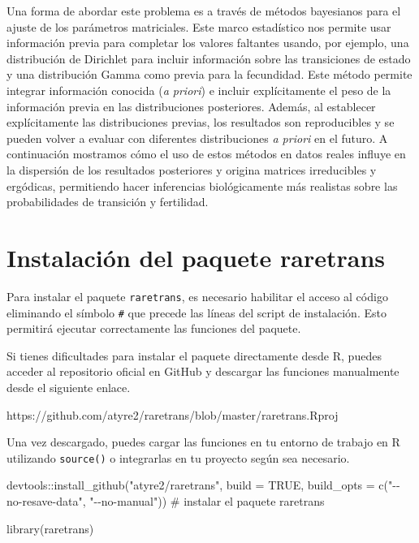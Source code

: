\documentclass[
  12pt,
  letterpaper,
]{book}
\newenvironment{Shaded}{\begin{snugshade}}{\end{snugshade}}
\newcommand{\AttributeTok}[1]{\textcolor[rgb]{0.40,0.45,0.13}{#1}}
\newcommand{\CommentTok}[1]{\textcolor[rgb]{0.37,0.37,0.37}{#1}}
\newcommand{\ConstantTok}[1]{\textcolor[rgb]{0.56,0.35,0.01}{#1}}
\newcommand{\FunctionTok}[1]{\textcolor[rgb]{0.28,0.35,0.67}{#1}}
\newcommand{\NormalTok}[1]{\textcolor[rgb]{0.00,0.23,0.31}{#1}}
\newcommand{\SpecialCharTok}[1]{\textcolor[rgb]{0.37,0.37,0.37}{#1}}
\newcommand{\StringTok}[1]{\textcolor[rgb]{0.13,0.47,0.30}{#1}}
\begin{document}
Una forma de abordar este problema es a través de métodos bayesianos
para el ajuste de los parámetros matriciales. Este marco estadístico nos
permite usar información previa para completar los valores faltantes
usando, por ejemplo, una distribución de Dirichlet para incluir
información sobre las transiciones de estado y una distribución Gamma
como previa para la fecundidad. Este método permite integrar información
conocida (\emph{a priori}) e incluir explícitamente el peso de la
información previa en las distribuciones posteriores. Además, al
establecer explícitamente las distribuciones previas, los resultados son
reproducibles y se pueden volver a evaluar con diferentes distribuciones
\emph{a priori} en el futuro. A continuación mostramos cómo el uso de
estos métodos en datos reales influye en la dispersión de los resultados
posteriores y origina matrices irreducibles y ergódicas, permitiendo
hacer inferencias biológicamente más realistas sobre las probabilidades
de transición y fertilidad.

\section{Instalación del paquete
raretrans}\label{instalaciuxf3n-del-paquete-raretrans}

Para instalar el paquete \texttt{raretrans}, es necesario habilitar el
acceso al código eliminando el símbolo \texttt{\#} que precede las
líneas del script de instalación. Esto permitirá ejecutar correctamente
las funciones del paquete.

Si tienes dificultades para instalar el paquete directamente desde R,
puedes acceder al repositorio oficial en GitHub y descargar las
funciones manualmente desde el siguiente enlace.

https://github.com/atyre2/raretrans/blob/master/raretrans.Rproj

Una vez descargado, puedes cargar las funciones en tu entorno de trabajo
en R utilizando \texttt{source()} o integrarlas en tu proyecto según sea
necesario.

\begin{Shaded}
\begin{Highlighting}[]
\NormalTok{devtools}\SpecialCharTok{::}\FunctionTok{install\_github}\NormalTok{(}\StringTok{"atyre2/raretrans"}\NormalTok{, }\AttributeTok{build =} \ConstantTok{TRUE}\NormalTok{, }\AttributeTok{build\_opts =} \FunctionTok{c}\NormalTok{(}\StringTok{"{-}{-}no{-}resave{-}data"}\NormalTok{, }\StringTok{"{-}{-}no{-}manual"}\NormalTok{)) }\CommentTok{\# instalar el paquete raretrans}

\FunctionTok{library}\NormalTok{(raretrans)}
\end{Highlighting}
\end{Shaded}
\end{document}
